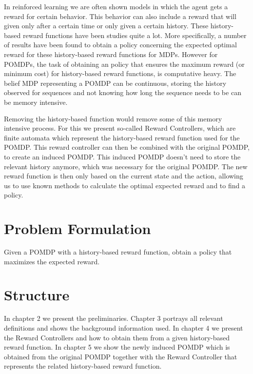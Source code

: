 In reinforced learning we are often shown models in which the agent gets a reward for certain behavior. This behavior can also include a reward that will given only after a certain time or only given a certain history. These history-based reward functions have been studies quite a lot. More specifically, a number of results have been found to obtain a policy concerning the expected optimal reward for these history-based reward functions for MDPs\cite{p:jirp}\cite{p:rdp}.
However for POMDPs, the task of obtaining an policy that ensures the maximum reward (or minimum cost) for history-based reward functions, is computative heavy. The belief MDP representing a POMDP can be continuous, storing the history observed for sequences and not knowing how long the sequence needs to be can be memory intensive.

Removing the history-based function would remove some of this memory intensive process. For this we present so-called Reward Controllers, which are finite automata which represent the history-based reward function used for the POMDP. This reward controller can then be combined with the original POMDP, to create an induced POMDP. This induced POMDP doesn't need to store the relevant history anymore, which was necessary for the original POMDP. The new reward function is then only based on the current state and the action, allowing us to use known methods to calculate the optimal expected reward and to find a policy.


\section*{Problem Formulation}
Given a POMDP with a history-based reward function, obtain a policy that maximizes the expected reward.


\section*{Structure}
In chapter 2 we present the preliminaries. Chapter 3 portrays all relevant definitions and shows the background information used.
In chapter 4 we present the Reward Controllers and how to obtain them from a given history-based reward function. In chapter 5 we show the newly induced POMDP which is obtained from the original POMDP together with the Reward Controller that represents the related history-based reward function. 
